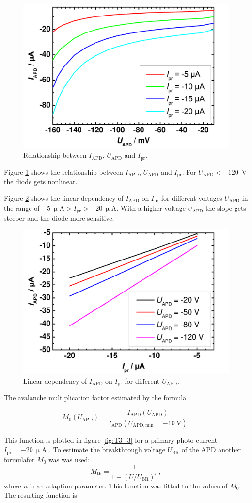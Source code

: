 \begin{figure}%
\centering
\includegraphics[width=.5\columnwidth]{Grafiken/T3_1.pdf}%
\caption{Relationship between  $I_{\mathrm{APD}}$,  $U_{\mathrm{APD}}$ and  $I_{\mathrm{pr}}$. }%
\label{fig:T3_1}%
\end{figure}

Figure \ref{fig:T3_1} shows the relationship between $I_{\mathrm{APD}}$,  $U_{\mathrm{APD}}$ and  $I_{\mathrm{pr}}$.
For $U_{\mathrm{APD}} < -120$~V the diode gets nonlinear. 

Figure \ref{fig:T3_2} shows the linear dependency of $I_{\mathrm{APD}}$ on $I_{\mathrm{pr}}$ for different voltages $U_{\mathrm{APD}}$ in the range of $-5~\upmu\mathrm{A} > I_{\mathrm{pr}} > - 20~\upmu\mathrm{A}$. With a higher voltage $U_{\mathrm{APD}}$ the slope gets steeper and the diode more sensitive.

\begin{figure}%
\centering
\includegraphics[width=.5\columnwidth]{Grafiken/T3_2.pdf}%
\caption{Linear dependency of $I_{\mathrm{APD}}$ on $I_{\mathrm{pr}}$ for different $U_{\mathrm{APD}}$.}%
\label{fig:T3_2}%
\end{figure}

The avalanche multiplication factor estimated by the formula

\begin{equation}
M_0(U_{\mathrm{APD}})=\frac{I_{\mathrm{APD}}(U_{\mathrm{APD}})}{I_{\mathrm{APD}}(U_{\mathrm{APD,min}}=-10\mathrm{~V})}.
\label{eq:M0}
\end{equation}

This function is plotted in figure \ref{fig:T3_3} for a primary photo current $I_{\mathrm{pr}}=-20~\upmu$A . To estimate the breakthrough voltage $U_{\mathrm{BR}}$ of the APD another formula\footnotemark[2] for $M_0$ was was used:
\begin{equation}
M_{\mathrm{th}} = \frac{1}{1-(U/U_{\mathrm{BR}})^n},
\label{eq:Mth}
\end{equation}
where $n$ is an adaption parameter. 
This function was fitted to the values of $M_0$. The resulting function is


